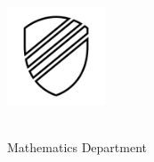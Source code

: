 \begin{coverpages}
{
\renewcommand\labelitemi{$\vcenter{\hbox{\tiny$\bullet$}}$}
    \begin{minipage}{0.25\linewidth}
        \includegraphics[width=2.9cm]{include/crest.png}
    \end{minipage}
    \begin{minipage}{0.7\linewidth}
        \begin{flushright}
        {\large
            \school\\\vspace{1ex}
            Mathematics Department\\\vspace{1ex}
            \course\\\vspace{1ex}
            \taskyear\\\vspace{1ex}
            \taskname\\\vspace{1ex}
        }
            \end{flushright}
    \end{minipage}
    
}
\end{coverpages}
